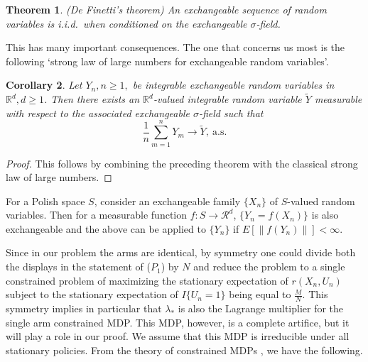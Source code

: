 \documentclass[12pt]{article}
\newtheorem{theorem}{Theorem}[section]
\newtheorem{corollary}[theorem]{Corollary}
\numberwithin{equation}{section}
\newcommand{\R}{\mathcal{R}}
\newcommand{\1}{\textbf{1}}
\begin{document}
\begin{enumerate}
\begin{theorem}  (\textit{De Finetti's theorem}) An exchangeable sequence of random variables is i.i.d.\ when conditioned on the exchangeable $\sigma$-field. \end{theorem}

This has many important consequences. The one that concerns us most is the following `strong law of large numbers for exchangeable random variables'.

\begin{corollary}\label{SLLNX} Let $Y_n, n \geq 1,$ be integrable exchangeable random variables in $\mathbb{R}^d, d \geq 1$.  Then there exists an $\mathbb{R}^d$-valued integrable random variable $\widetilde{Y}$ measurable with respect to the associated exchangeable $\sigma$-field such that
$$\frac{1}{n}\sum_{m=1}^nY_m \to \widetilde{Y}, \ \mbox{a.s.}$$
\end{corollary}
\begin{proof} This follows by combining the preceding theorem with the classical strong law of large numbers.
\end{proof}

For a Polish space $S$, consider an exchangeable family $\{X_n\}$ of $S$-valued random variables. Then for   a  measurable function $f: S \to \R^d$, $\{Y_n = f(X_n)\}$ is also exchangeable and the above can be applied to $\{Y_n\}$ if $E[\|f(Y_n)\|] < \infty$.
\end{enumerate}


Since in our problem the arms are identical, by symmetry one could divide both the displays in the statement of ($P_1$) by $N$ 
and reduce the problem to a single constrained problem of maximizing the stationary expectation of $r(X_n,U_n)$ subject to the stationary 
expectation of  $I\{U_n=1\}$ being equal to $\frac{M}{N}$. This symmetry implies in particular that $\lambda_*$ 
is also the Lagrange multiplier for the single arm constrained MDP. This MDP, however, is a complete artifice, 
but it will play a role in our proof. We assume that this MDP is irreducible under all stationary policies. 
From the theory of constrained MDPs \cite{Altman,Ross,Piunov}, we have the following.
\end{document}
